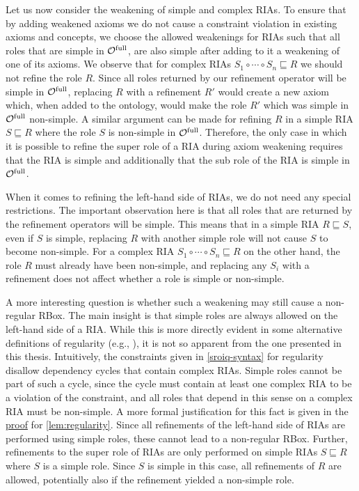 
Let us now consider the weakening of simple and complex RIAs. To ensure that by adding weakened axioms we do not cause a constraint violation in existing axioms and concepts, we choose the allowed weakenings for RIAs such that all roles that are simple in ${\mathcal{O}^\textnormal{full}}$, are also simple after adding to it a weakening of one of its axioms. We observe that for complex RIAs $S_1 \circ \cdots \circ S_n \sqsubseteq R$ we should not refine the role $R$. Since all roles returned by our refinement operator will be simple in ${\mathcal{O}^\textnormal{full}}$, replacing $R$ with a refinement $R'$ would create a new axiom which, when added to the ontology, would make the role $R'$ which was simple in ${\mathcal{O}^\textnormal{full}}$ non-simple. A similar argument can be made for refining $R$ in a simple RIA $S \sqsubseteq R$ where the role $S$ is non-simple in ${\mathcal{O}^\textnormal{full}}$. Therefore, the only case in which it is possible to refine the super role of a RIA during axiom weakening requires that the RIA is simple and additionally that the sub role of the RIA is simple in ${\mathcal{O}^\textnormal{full}}$.

When it comes to refining the left-hand side of RIAs, we do not need any special restrictions. The important observation here is that all roles that are returned by the refinement operators will be simple. This means that in a simple RIA $R \sqsubseteq S$, even if $S$ is simple, replacing $R$ with another simple role will not cause $S$ to become non-simple. For a complex RIA $S_1 \circ \cdots \circ S_n \sqsubseteq R$ on the other hand, the role $R$ must already have been non-simple, and replacing any $S_i$ with a refinement does not affect whether a role is simple or non-simple.

A more interesting question is whether such a weakening may still cause a non-regular RBox. The main insight is that simple roles are always allowed on the left-hand side of a RIA. While this is more directly evident in some alternative definitions of regularity (e.g., \cite{rudolph2011foundations}), it is not so apparent from the one presented in this thesis. Intuitively, the constraints given in \cref{sroiq-syntax} for regularity disallow dependency cycles that contain complex RIAs. Simple roles cannot be part of such a cycle, since the cycle must contain at least one complex RIA to be a violation of the constraint, and all roles that depend in this sense on a complex RIA must be non-simple. A more formal justification for this fact is given in the \hyperref[proof:regularity]{proof} for \cref{lem:regularity}. Since all refinements of the left-hand side of RIAs are performed using simple roles, these cannot lead to a non-regular RBox. Further, refinements to the super role of RIAs are only performed on simple RIAs $S \sqsubseteq R$ where $S$ is a simple role. Since $S$ is simple in this case, all refinements of $R$ are allowed, potentially also if the refinement yielded a non-simple role.


